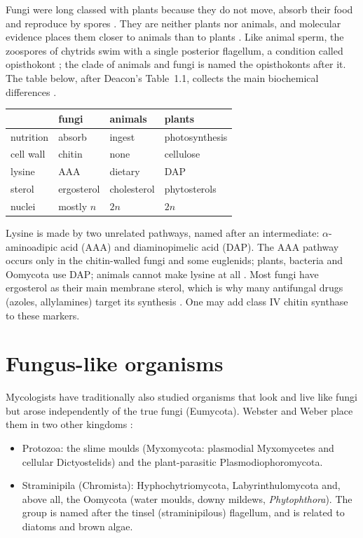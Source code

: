 Fungi were long classed with plants because
they do not move, absorb their food and
reproduce by spores
\cite[Section 1.5]{webster2007fungi}.
They are neither plants nor animals, and
molecular evidence places them closer to
animals than to plants
\cite[Chapter 1]{deacon2006fungal}. Like
animal sperm, the zoospores of chytrids
swim with a single posterior flagellum, a
condition called opisthokont
\cite[Section 1.4]{webster2007fungi}; the
clade of animals and fungi is named the
opisthokonts after it. The table below, after
Deacon's Table~1.1, collects the main
biochemical differences
\cite[Chapter 1]{deacon2006fungal}.

\begin{center}
\begin{tabular}{llll}
 & fungi & animals & plants \\
\hline
nutrition & absorb & ingest &
photosynthesis \\
cell wall & chitin & none &
cellulose \\
lysine & AAA & dietary &
DAP \\
sterol & ergosterol & cholesterol &
phytosterols \\
nuclei & mostly $n$ & $2n$ & $2n$ \\
\end{tabular}
\end{center}

Lysine is made by two unrelated pathways,
named after an intermediate:
$\alpha$-aminoadipic acid (AAA) and
diaminopimelic acid (DAP). The AAA pathway
occurs only in the chitin-walled fungi and
some euglenids; plants, bacteria and
Oomycota use DAP; animals cannot make lysine
at all \cite[Chapter 7]{deacon2006fungal}.
Most fungi have ergosterol as their main
membrane sterol, which is why many
antifungal drugs (azoles, allylamines)
target its synthesis
\cite[Chapter 13]{webster2007fungi}.
One may add class IV
chitin synthase to these markers.

\section{Fungus-like organisms}
\label{section-fungus-like}

Mycologists have traditionally also studied
organisms that look and live like fungi but
arose independently of the true fungi
(Eumycota). Webster and Weber place them in
two other kingdoms
\cite[Section 1.5]{webster2007fungi}:
\begin{itemize}
\item Protozoa: the slime moulds
(Myxomycota: plasmodial Myxomycetes and
cellular Dictyostelids) and the
plant-parasitic Plasmodiophoromycota.
\item Straminipila (Chromista):
Hyphochytriomycota, Labyrinthulomycota and,
above all, the Oomycota (water moulds,
downy mildews, \emph{Phytophthora}). The
group is named after the tinsel
(straminipilous) flagellum, and is related
to diatoms and brown algae.
\end{itemize}


